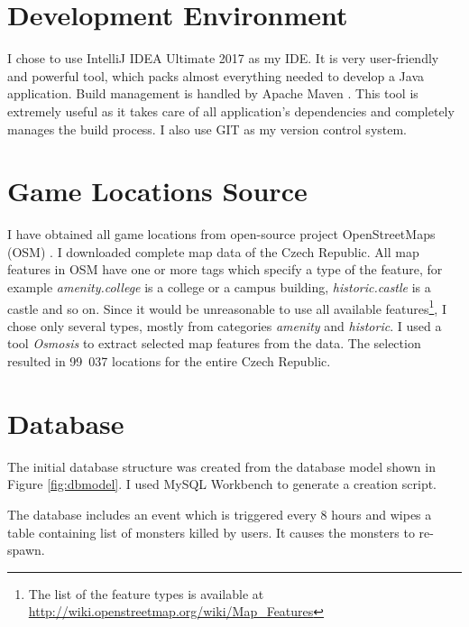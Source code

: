 \section{Development Environment}
I chose to use IntelliJ IDEA Ultimate 2017 \cite{idea} as my IDE. It is very user-friendly and powerful tool, which packs almost everything needed to develop a Java application. Build management is handled by Apache Maven \cite{maven}. This tool is extremely useful as it takes care of all application's dependencies and completely manages the build process. I also use GIT \cite{git} as my version control system. 

\section{Game Locations Source}
I have obtained all game locations from open-source project OpenStreetMaps (OSM) \cite{osm}. I downloaded complete map data of the Czech Republic. All map features in OSM have one or more tags which specify a type of the feature, for example \textit{amenity.college} is a college or a campus building, \textit{historic.castle} is a castle and so on. Since it would be unreasonable to use all available features\footnote{The list of the feature types is available at \url{http://wiki.openstreetmap.org/wiki/Map_Features}}, I chose only several types, mostly from categories \textit{amenity} and \textit{historic}. I used a tool \textit{Osmosis} \cite{osmosis} to extract selected map features from the data. The selection resulted in 99~037 locations for the entire Czech Republic.

\section{Database}
The initial database structure was created from the database model shown in Figure \ref{fig:dbmodel}. I used MySQL Workbench \cite{mysqlworkbench} to generate a creation script.

The database includes an event which is triggered every 8 hours and wipes a table containing list of monsters killed by users. It causes the monsters to re-spawn.  

